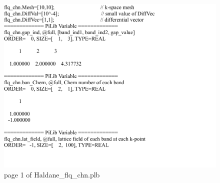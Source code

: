 \documentclass[10pt,a4paper]{article}
\begin{document}
  
\begin{figure}[tbp]
\centering
\includegraphics[width=0.9\columnwidth]{Haldane_flq_chn.pdf}
\caption{page 1 of Haldane\_flq\_chn.plb}
\end{figure}
\end{document}
